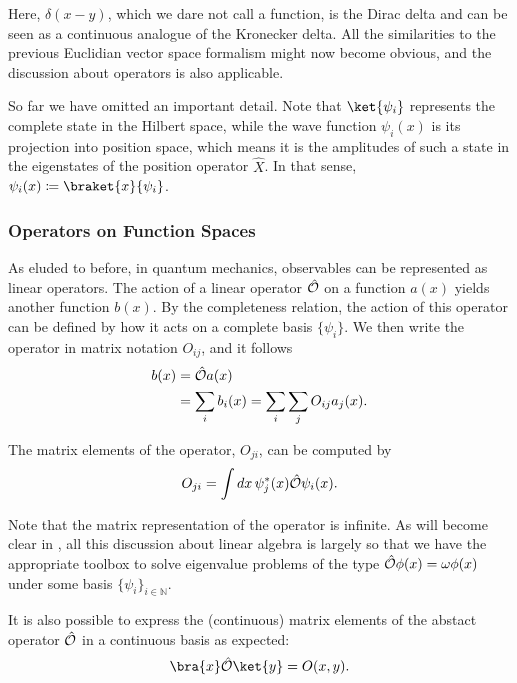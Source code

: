 Here, $\delta(x - y)$, which we dare not call a function, is the Dirac delta and can be seen as a continuous analogue of the Kronecker delta. All the similarities to the previous Euclidian vector space formalism might now become obvious, and the discussion about operators is also applicable. 

So far we have omitted an important detail. Note that $\ket{\psi_i}$ represents the complete state in the Hilbert space, while the wave function $\psi_i(x)$ is its projection into position space, which means it is the amplitudes of such a state in the eigenstates of the position operator $\hat{X}$. In that sense, $\psi_i(x) \coloneqq \braket{x}{\psi_i}$. 

\subsubsection{Operators on Function Spaces}

As eluded to before, in quantum mechanics, observables can be represented as linear operators. The action of a linear operator $\hat{\mathcal{O}}$ on a function $a(x)$ yields another function $b(x)$. By the completeness relation, the action of this operator can be defined by how it acts on a complete basis $\{\psi_i\}$. We then write the operator in matrix notation  $O_{ij}$, and it follows
\begin{align*}
    b(x) &= \hat{\mathcal{O}}a(x) \\
   &=\sum_i b_i(x) = \sum_i\sum_j O_{ij} a_j(x).
\end{align*}

The matrix elements of the operator, $O_{ji}$, can be computed by
\begin{align*}
    O_{ji} = \int dx \, \psi_j^*(x) \hat{\mathcal{O}}\psi_i(x).
\end{align*}

\begin{JTD}
Note that the matrix representation of the operator is infinite. As will become clear in , all this discussion about linear algebra is largely so that we have the appropriate toolbox to solve eigenvalue problems of the type $\hat{\mathcal{O}} \phi(x) = \omega \phi(x)$ under some basis $\{\psi_i\}_{i\in \mathbb{N}}$. 
\end{JTD}

It is also possible to express the (continuous) matrix elements of the abstact operator $\hat{\mathcal{O}}$ in a continuous basis as expected: 
\begin{align*}
    \bra{x}\op{O}\ket{y} = O(x,y).
\end{align*}

